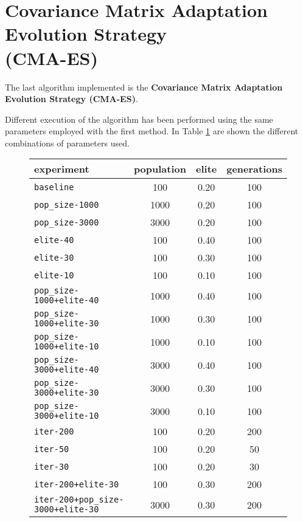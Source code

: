 \section{Covariance Matrix Adaptation Evolution Strategy \\(CMA-ES)}

The last algorithm implemented is the \textbf{Covariance Matrix Adaptation Evolution Strategy (CMA-ES)}. 

Different execution of the algorithm has been performed using the same parameters employed with the first method. In Table \ref{tab:cmaes-param} are shown the different combinations of parameters used.

\begin{figure}[htb]
	\centering
	
	\begin{tabular}{lccc}
		\toprule
		\textbf{experiment} & \textbf{population} & \textbf{elite} &
		\textbf{generations} \\
		\midrule
		\texttt{baseline 						}	 & 100 	& 0.20 	& 100\\
		\texttt{pop\_size-1000 					}	 & 1000 	& 0.20 	& 100\\
		\texttt{pop\_size-3000 					}	 & 3000 	& 0.20 	& 100\\
		\texttt{elite-40 						}	 & 100 	& 0.40 	& 100\\
		\texttt{elite-30 						}	 & 100 	& 0.30 	& 100\\
		\texttt{elite-10 						}	 & 100 	& 0.10 	& 100\\
		\texttt{pop\_size-1000+elite-40 		}	 & 1000 	& 0.40 	& 100\\
		\texttt{pop\_size-1000+elite-30 		}	 & 1000 	& 0.30 	& 100\\
		\texttt{pop\_size-1000+elite-10 		}	 & 1000 	& 0.10 	& 100\\
		\texttt{pop\_size-3000+elite-40 		}	 & 3000 	& 0.40 	& 100\\
		\texttt{pop\_size-3000+elite-30 		}	 & 3000 	& 0.30 	& 100\\
		\texttt{pop\_size-3000+elite-10 		}	 & 3000 	& 0.10 	& 100\\
		\texttt{iter-200 						}	 & 100 	& 0.20 	& 200\\
		\texttt{iter-50 						}	 & 100 	& 0.20 	& 50\\
		\texttt{iter-30 						}	 & 100 	& 0.20 	& 30\\
		\texttt{iter-200+elite-30 				}	 & 100 	& 0.30 	& 200\\
		\texttt{iter-200+pop\_size-3000+elite-30} 	 & 3000 	& 0.30 	& 200\\	
		\bottomrule
	\end{tabular}
	\label{tab:cmaes-param}
\end{figure}

